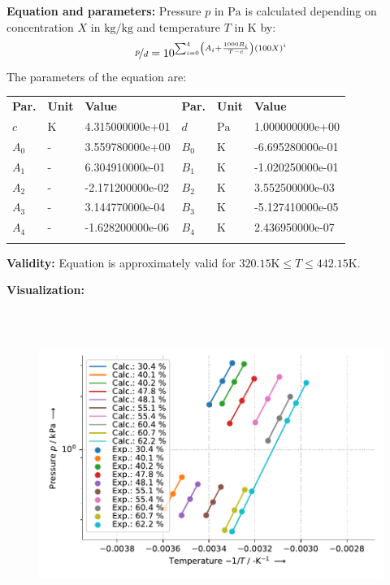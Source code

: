 \textbf{Equation and parameters:}
\newline
%
Pressure $p$ in $\si{\pascal}$ is calculated depending on concentration $X$ in $\si{\kilogram\per\kilogram}$ and  temperature $T$ in $\si{\kelvin}$ by:
%
\begin{equation*}
\nicefrac{p}{d} = 10 ^ { \sum_{i=0}^{4} \left( A_i + \frac{1000 B_i}{T - c} \right) \left( 100 X \right) ^{i}}
\end{equation*}
%
The parameters of the equation are:
%
\begin{longtable}[l]{lll|lll}
\toprule
\addlinespace
\textbf{Par.} & \textbf{Unit} & \textbf{Value} &	\textbf{Par.} & \textbf{Unit} & \textbf{Value} \\
\addlinespace
\midrule
\endhead

\bottomrule
\endfoot
\bottomrule
\endlastfoot
\addlinespace

$c$ & $\si{\kelvin}$ & 4.315000000e+01 & $d$ & $\si{\pascal}$ & 1.000000000e+00 \\
$A_0$ & - & 3.559780000e+00 & $B_0$ & $\si{\kelvin}$ & -6.695280000e-01 \\
$A_1$ & - & 6.304910000e-01 & $B_1$ & $\si{\kelvin}$ & -1.020250000e-01 \\
$A_2$ & - & -2.171200000e-02 & $B_2$ & $\si{\kelvin}$ & 3.552500000e-03 \\
$A_3$ & - & 3.144770000e-04 & $B_3$ & $\si{\kelvin}$ & -5.127410000e-05 \\
$A_4$ & - & -1.628200000e-06 & $B_4$ & $\si{\kelvin}$ & 2.436950000e-07 \\

\addlinespace\end{longtable}

\textbf{Validity:}
\newline
Equation is approximately valid for $320.15 \si{\kelvin} \leq T \leq 442.15 \si{\kelvin}$.
\newline

\textbf{Visualization:}
%
\begin{figure}[!htp]
{\noindent\includegraphics[height=10cm, keepaspectratio]{figs/abs/abs_Water_LiBr_LiNO3_massRatio_348_69_Antoine_1.pdf}}
\end{figure}
%

